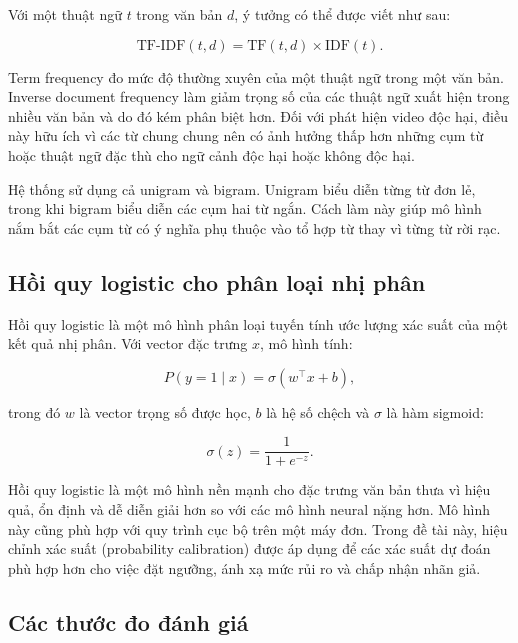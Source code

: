 Với một thuật ngữ \(t\) trong văn bản \(d\), ý tưởng có thể được viết như sau:

\begin{equation}
    \text{TF-IDF}(t,d) =
    \text{TF}(t,d) \times \text{IDF}(t).
\end{equation}

Term frequency đo mức độ thường xuyên của một thuật ngữ trong một văn bản. Inverse document frequency làm giảm trọng số của các thuật ngữ xuất hiện trong nhiều văn bản và do đó kém phân biệt hơn. Đối với phát hiện video độc hại, điều này hữu ích vì các từ chung chung nên có ảnh hưởng thấp hơn những cụm từ hoặc thuật ngữ đặc thù cho ngữ cảnh độc hại hoặc không độc hại.

Hệ thống sử dụng cả unigram và bigram. Unigram biểu diễn từng từ đơn lẻ, trong khi bigram biểu diễn các cụm hai từ ngắn. Cách làm này giúp mô hình nắm bắt các cụm từ có ý nghĩa phụ thuộc vào tổ hợp từ thay vì từng từ rời rạc.

\subsection{Hồi quy logistic cho phân loại nhị phân}

Hồi quy logistic là một mô hình phân loại tuyến tính ước lượng xác suất của một kết quả nhị phân. Với vector đặc trưng \(x\), mô hình tính:

\begin{equation}
    P(y=1 \mid x) = \sigma(w^\top x + b),
\end{equation}

trong đó \(w\) là vector trọng số được học, \(b\) là hệ số chệch và \(\sigma\) là hàm sigmoid:

\begin{equation}
    \sigma(z) = \frac{1}{1 + e^{-z}}.
\end{equation}

Hồi quy logistic là một mô hình nền mạnh cho đặc trưng văn bản thưa vì hiệu quả, ổn định và dễ diễn giải hơn so với các mô hình neural nặng hơn. Mô hình này cũng phù hợp với quy trình cục bộ trên một máy đơn. Trong đề tài này, hiệu chỉnh xác suất (probability calibration) được áp dụng để các xác suất dự đoán phù hợp hơn cho việc đặt ngưỡng, ánh xạ mức rủi ro và chấp nhận nhãn giả.

\subsection{Các thước đo đánh giá}

